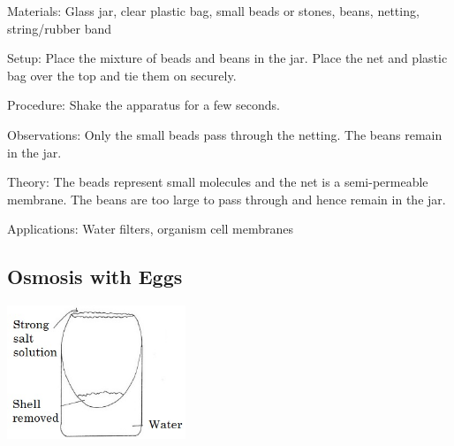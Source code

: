 \begin{multicols}{2}
\begin{description*}
\item[Materials:]{Glass jar, clear plastic bag, small beads or stones, beans, netting, string/rubber band}
\item[Setup:]{Place the mixture of beads and beans in the jar. Place the net and plastic bag over the top and tie them on securely.}
\item[Procedure:]{Shake the apparatus for a few seconds.}
\item[Observations:]{Only the small beads pass through the netting. The beans remain in the jar.}
\item[Theory:]{The beads represent small molecules and the net is a semi-permeable membrane. The beans are too large to pass through and hence remain in the jar.}
\item[Applications:]{Water filters, organism cell membranes}
\end{description*}

\subsection{Osmosis with Eggs} %

\begin{center}
\includegraphics[width=0.4\textwidth]{./img/vso/osmosis-eggs.jpg}
\end{center}


\end{multicols}
